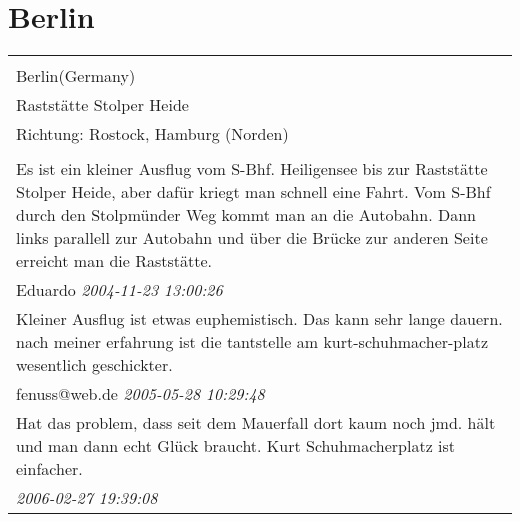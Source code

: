 \documentclass[a4paper,12pt]{article}
\begin{document}
\section{Berlin}
\begin{tabular}{|p{13cm}|}
\hline\\
Berlin(Germany)\\
Raststätte Stolper Heide\\
Richtung: Rostock, Hamburg (Norden) \\
\hline\\
Es ist ein kleiner Ausflug vom S-Bhf. Heiligensee bis zur Raststätte Stolper Heide, aber dafür kriegt man schnell eine Fahrt. Vom S-Bhf durch den Stolpmünder Weg kommt man an die Autobahn. Dann links parallell zur Autobahn und über die Brücke zur anderen Seite erreicht man die Raststätte. \\
Eduardo \textit{ 2004-11-23 13:00:26 }\\\hline Kleiner Ausflug ist etwas euphemistisch. Das kann sehr lange dauern. nach meiner erfahrung ist die tantstelle am kurt-schuhmacher-platz wesentlich geschickter. \\
fenuss@web.de \textit{ 2005-05-28 10:29:48 }\\\hline Hat das problem, dass seit dem Mauerfall dort kaum noch jmd. hält und man dann echt Glück braucht. Kurt Schuhmacherplatz ist einfacher. \\
\textit{ 2006-02-27 19:39:08 }\\\hline
\end{tabular}
\end{document}
